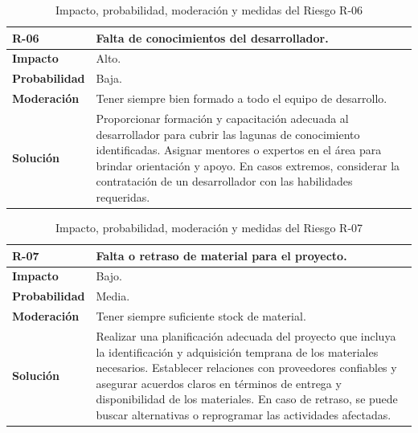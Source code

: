 \begin{table}[htbp]
\begin{center}
\begin{tabular}{|l|p{12cm}|}
\hline
\textbf{R-06} & Falta de conocimientos del desarrollador. \\ \hline
\textbf{Impacto} & Alto. \\ \hline
\textbf{Probabilidad} & Baja. \\ \hline
\textbf{Moderación} & Tener siempre bien formado a todo el equipo de desarrollo. \\ \hline
\textbf{Solución} & Proporcionar formación y capacitación adecuada al desarrollador para cubrir las lagunas de conocimiento identificadas. Asignar mentores o expertos en el área para brindar orientación y apoyo. En casos extremos, considerar la contratación de un desarrollador con las habilidades requeridas.\\ \hline
\end{tabular}
\caption[Riesgo R-06]{Impacto, probabilidad, moderación y medidas del Riesgo R-06}
\label{tabla:r-06}
\end{center}
\end{table}

\begin{table}[htbp]
\begin{center}
\begin{tabular}{|l|p{12cm}|}
\hline
\textbf{R-07} & Falta o retraso de material para el proyecto. \\ \hline
\textbf{Impacto} & Bajo. \\ \hline
\textbf{Probabilidad} & Media. \\ \hline
\textbf{Moderación} & Tener siempre suficiente stock de material. \\ \hline
\textbf{Solución} & Realizar una planificación adecuada del proyecto que incluya la identificación y adquisición temprana de los materiales necesarios. Establecer relaciones con proveedores confiables y asegurar acuerdos claros en términos de entrega y disponibilidad de los materiales. En caso de retraso, se puede buscar alternativas o reprogramar las actividades afectadas.\\ \hline
\end{tabular}
\caption[Riesgo R-07]{Impacto, probabilidad, moderación y medidas del Riesgo R-07}
\label{tabla:r-07}
\end{center}
\end{table}

